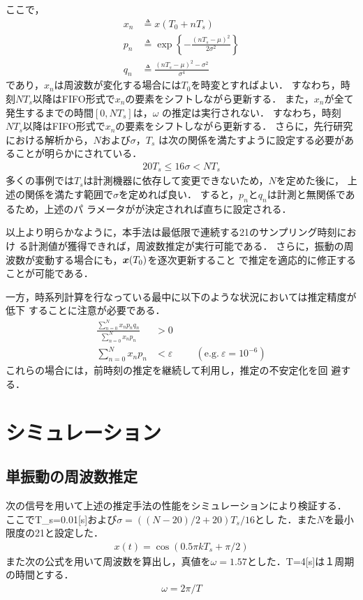 \documentclass[a4paper,12pt]{jarticle}
\def\vec#1{\mbox{\boldmath$#1$}}
\begin{document}
ここで，
\begin{align*}
 x_n&\triangleq x(T_0+nT_s)\\
%
 p_n&\triangleq \exp\left\{-\frac{(nT_s-\mu)^2}{2\sigma^2}\right\}\\
%
 q_n&\triangleq \frac{(nT_s-\mu)^2-\sigma^2}{\sigma^4}
\end{align*}
であり，$x_n$は周波数が変化する場合には$T_0$を時変とすればよい．
すなわち，時刻$NT_s$以降はFIFO形式で$x_n$の要素をシフトしながら更新する．
また，$x_n$が全て発生するまでの時間$[0,NT_s]$は，$\omega$
の推定は実行されない．
すなわち，時刻$NT_s$以降はFIFO形式で$x_n$の要素をシフトしながら更新する．
%
さらに，先行研究における解析から，$N$および$\sigma$，$T_s$
は次の関係を満たすように設定する必要があることが明らかにされている\cite{Ni}．
\begin{align}
 20T_s \leq 16\sigma < NT_s\label{20}
\end{align}
多くの事例では$T_s$は計測機器に依存して変更できないため，$N$を定めた後に，
上述の関係を満たす範囲で$\sigma$を定めれば良い．
すると，$p_n$と$q_n$は計測と無関係であるため，上述のパ
ラメータがが決定されれば直ちに設定される．

以上より明らかなように，本手法は最低限で連続する21のサンプリング時刻におけ
る計測値が獲得できれば，周波数推定が実行可能である．
%
さらに，振動の周波数が変動する場合にも，$\vec{x}(T_0)$を逐次更新すること
で推定を適応的に修正することが可能である．

一方，時系列計算を行なっている最中に以下のような状況においては推定精度が低下
することに注意が必要である．
\begin{align}
 \frac{\sum^{N}_{n=0}x_np_nq_n}{\sum^{N}_{n=0}x_np_n}&>0\\ \label{21}
 \sum^{N}_{n=0}x_np_n&<\varepsilon \hspace{1cm} (\mbox{e.g.}\  \varepsilon=10^{-6})
\label{22}\end{align}
これらの場合には，前時刻の推定を継続して利用し，推定の不安定化を回
避する．

\section{シミュレーション}
\label{sec:simulation}
\subsection{単振動の周波数推定}
次の信号を用いて上述の推定手法の性能をシミュレーションにより検証する．
ここでT_s=0.01[s]および$\sigma=((N-20)/2+20)T_s/16$とし
た．また$N$を最小限度の21と設定した．
\begin{align}
 x(t)=\cos(0.5\pi kT_s+\pi/2)\label{073008_21Feb15}
\end{align}
また次の公式を用いて周波数を算出し\cite{omega}，真値を$\omega=1.57$とした．T=4[s]は１周期の時間とする．
\begin{align}
 \omega=2\pi/T \label{truevalue}
\end{align}
\end{document}
